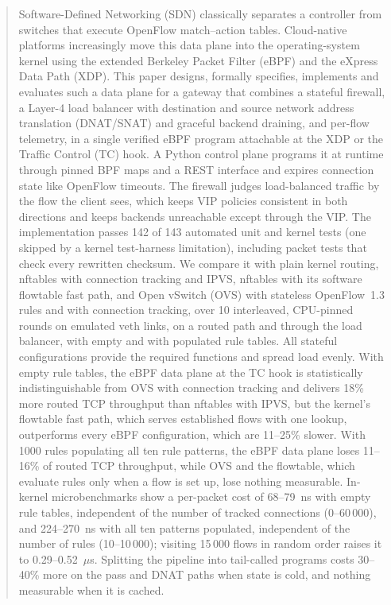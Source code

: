\documentclass[conference]{IEEEtran}
\begin{document}
\begin{abstract}
Software-Defined Networking (SDN) classically separates a controller from
switches that execute OpenFlow match--action tables. Cloud-native platforms
increasingly move this data plane into the operating-system kernel using the
extended Berkeley Packet Filter (eBPF) and the eXpress Data Path (XDP). This
paper designs, formally specifies, implements and evaluates such a data plane
for a gateway that combines a stateful firewall, a Layer-4 load balancer with
destination and source network address translation (DNAT/SNAT) and graceful
backend draining, and per-flow telemetry, in a single verified eBPF program
attachable at the XDP or the Traffic Control (TC) hook. A Python control plane
programs it at runtime through pinned BPF maps and a REST interface and
expires connection state like OpenFlow timeouts. The firewall judges
load-balanced traffic by the flow the client sees, which keeps VIP policies
consistent in both directions and keeps backends unreachable except through
the VIP. The implementation passes 142 of 143 automated unit and kernel tests
(one skipped by a kernel test-harness limitation), including packet tests
that check every rewritten checksum. We compare it with plain kernel routing,
nftables with connection tracking and IPVS, nftables with its software
flowtable fast path, and Open vSwitch (OVS) with stateless OpenFlow~1.3 rules
and with connection tracking, over 10 interleaved, CPU-pinned rounds on
emulated veth links, on a routed path and through the load balancer, with
empty and with populated rule tables. All stateful configurations provide the
required functions and spread load evenly. With empty rule tables, the eBPF
data plane at the TC hook is statistically indistinguishable from OVS with
connection tracking and delivers 18\% more routed TCP throughput than
nftables with IPVS, but the kernel's flowtable fast path, which serves
established flows with one lookup, outperforms every eBPF configuration,
which are 11--25\% slower. With 1000 rules populating all ten rule patterns, the eBPF
data plane loses 11--16\% of routed TCP throughput, while OVS and the
flowtable, which evaluate rules only when a flow is set up, lose nothing
measurable. In-kernel microbenchmarks show a per-packet cost of 68--79~ns
with empty rule tables, independent of the number of tracked connections
(0--60\,000), and 224--270~ns with all ten patterns populated, independent of
the number of rules (10--10\,000); visiting 15\,000 flows in random order raises it to
0.29--0.52~$\mu$s. Splitting the pipeline into tail-called programs costs
30--40\% more on the pass and DNAT paths when state is cold, and nothing
measurable when it is cached.
\end{abstract}
\end{document}
